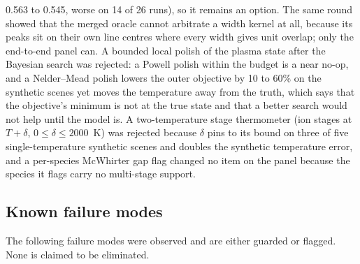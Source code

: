 0.563 to 0.545, worse on 14 of 26 runs), so it remains an option. The same round showed that the
merged oracle cannot arbitrate a width kernel at all, because its peaks sit on their own line
centres where every width gives unit overlap; only the end-to-end panel can. A bounded local polish
of the plasma state after the Bayesian search was rejected: a Powell polish within the budget is a
near no-op, and a Nelder--Mead polish lowers the outer objective by 10 to 60\% on the synthetic
scenes yet moves the temperature away from the truth, which says that the objective's minimum is
not at the true state and that a better search would not help until the model is. A two-temperature
stage thermometer (ion stages at $T+\delta$, $0 \le \delta \le 2000$~K) was rejected because
$\delta$ pins to its bound on three of five single-temperature synthetic scenes and doubles the
synthetic temperature error, and a per-species McWhirter gap flag changed no item on the panel
because the species it flags carry no multi-stage support. %

\subsection{Known failure modes}

The following failure modes were observed and are either guarded or flagged. None is claimed to be eliminated.

